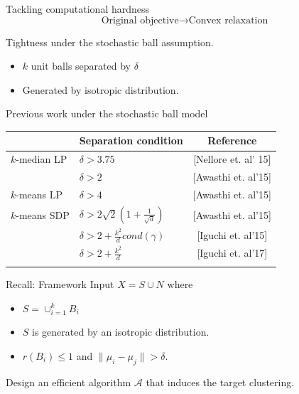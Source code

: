 \documentclass{beamer}
\newcommand{\mc}{\mathcal}
\begin{document}
\begin{frame}{Tackling computational hardness}
	$$\text{Original objective} \longrightarrow \text{Convex relaxation}$$
	
	\vspace{20pt}Tightness under the {\color{blue}stochastic ball assumption}.
	\begin{itemize}
		\vspace{10pt}\item $k$ unit balls separated by $\delta$
		\vspace{10pt}\item Generated by isotropic distribution. 
	\end{itemize}	
\end{frame}

\begin{frame}{Previous work under the stochastic ball model}
	\begin{table}
		\centering
		\label{table:stochasticBall}
		\setlength{\tabcolsep}{0.7em} 
		{\renewcommand{\arraystretch}{1.5}%
		\begin{tabular}{llc}
		\\
		 & Separation condition & Reference\\
		 \hline
		$k$-median LP & $\delta > 3.75$ & \alert{[Nellore et. al' 15]}\\
		 & $\delta > 2$ & \alert{[Awasthi et. al'15]}\\
		\hline
		$k$-means LP & $\delta > 4$ & \alert{[Awasthi et. al'15]}\\
		\hline
		$k$-means SDP & $\delta > 2\sqrt2 (1 + \frac{1}{\sqrt d})$ & \alert{[Awasthi et. al'15]}\\
		 & $\delta > 2 + \frac{k^2}{d}cond(\gamma)$ & \alert{[Iguchi et. al'15]}\\
		 & $\delta > 2 + \frac{k^2}{d}$ & \alert{[Iguchi et. al'17]}\\

		\label{table:alphacenter}
		\end{tabular}
		}
	\end{table}
\end{frame}

\begin{frame}{Recall: Framework}
	Input $X =  S \cup N$ where
	\begin{itemize}
		\vspace{10pt}\item $S = \cup_{i=1}^k B_i$
		\vspace{10pt}\item $S$ is generated by an isotropic distribution. 
		\vspace{10pt}\item $r(B_i) \le 1$ and $\|\mu_i - \mu_j\| > \delta$.
	\end{itemize}
	
	\vspace{20pt}Design an efficient algorithm  $\mc A$ that induces the target clustering. 
\end{frame}
\end{document}
